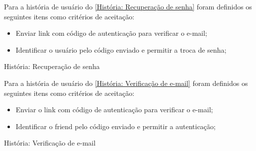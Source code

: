 Para a história de usuário do \autoref{História: Recuperação de senha} foram definidos os seguintes itens como critérios de aceitação:

\begin{itemize}
\item Enviar link com código de autenticação para verificar o e-mail;
\item Identificar o usuário pelo código enviado e permitir a troca de senha;
\end{itemize}

\def\arraystretch{2}
\begin{quadro}[htb]
\centering
\ABNTEXfontereduzida
\caption[História: Recuperação de senha]{História: Recuperação de senha}
\label{História: Recuperação de senha}
\end{quadro}
\FloatBarrier 

Para a história de usuário do \autoref{História: Verificação de e-mail} foram definidos os seguintes itens como critérios de aceitação:

\begin{itemize}
\item Enviar o link com código de autenticação para verificar o e-mail;
\item Identificar o \gls{friend} pelo código enviado e permitir a autenticação;
\end{itemize}

\def\arraystretch{2}
\begin{quadro}[htb]
\centering
\ABNTEXfontereduzida
\caption[História: Verificação de e-mail]{História: Verificação de e-mail}
\label{História: Verificação de e-mail}
\end{quadro}
\FloatBarrier 

